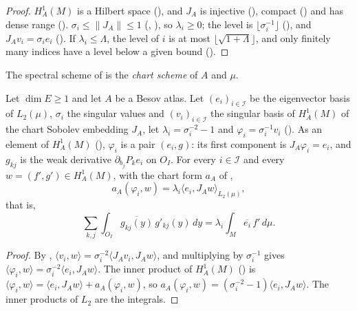 \begin{proof}
\leanok
$H^1_A(M)$ is a Hilbert space (), and $J_A$ is injective
(), compact () and has dense range
(). $\sigma_i \leq \|J_A\| \leq 1$ (,
), so $\lambda_i \geq 0$; the level is
$\lfloor \sigma_i^{-1} \rfloor$ (), and
$J_A v_i = \sigma_i e_i$ (). If $\lambda_i \leq \Lambda$, the level of
$i$ is at most $\lfloor \sqrt{1 + \Lambda} \rfloor$, and only finitely many indices have a level
below a given bound ().
\end{proof}

The spectral scheme of  is the \emph{chart scheme} of $A$ and $\mu$.

\begin{theorem}
\label{thm:chart-weak-eigen}
\leanok
{}
Let $\dim E \geq 1$ and let $A$ be a Besov atlas. Let $(e_i)_{i \in \mathcal{I}}$ be the
eigenvector basis of $L_2(\mu)$, $\sigma_i$ the singular values and $(v_i)_{i \in \mathcal{I}}$
the singular basis of $H^1_A(M)$ of the chart Sobolev embedding $J_A$, let
$\lambda_i = \sigma_i^{-2} - 1$ and $\varphi_i = \sigma_i^{-1} v_i$ ().
As an element of $H^1_A(M)$ (), $\varphi_i$ is a pair $(e_i, g)$: its
first component is $J_A \varphi_i = e_i$, and $g_{kj}$ is the weak derivative
$\partial_{b_j} P_k e_i$ on $O_I$. For every $i \in \mathcal{I}$ and every
$w = (f', g') \in H^1_A(M)$, with the chart form $a_A$ of ,
\[
  a_A(\varphi_i, w) = \lambda_i \langle e_i, J_A w \rangle_{L_2(\mu)} ,
\]
that is,
\[
  \sum_{k, j} \int_{O_I} \overline{g_{kj}(y)} \, g'_{kj}(y) \, dy
    = \lambda_i \int_M \overline{e_i} \, f' \, d\mu .
\]
\end{theorem}

\begin{proof}
\leanok
By , $\langle v_i, w \rangle = \sigma_i^{-2}
\langle J_A v_i, J_A w \rangle$, and multiplying by $\sigma_i^{-1}$ gives
$\langle \varphi_i, w \rangle = \sigma_i^{-2} \langle e_i, J_A w \rangle$. The inner product of
$H^1_A(M)$ () is
$\langle \varphi_i, w \rangle = \langle e_i, J_A w \rangle + a_A(\varphi_i, w)$, so
$a_A(\varphi_i, w) = (\sigma_i^{-2} - 1) \langle e_i, J_A w \rangle$. The inner products of
$L_2$ are the integrals.
\end{proof}

